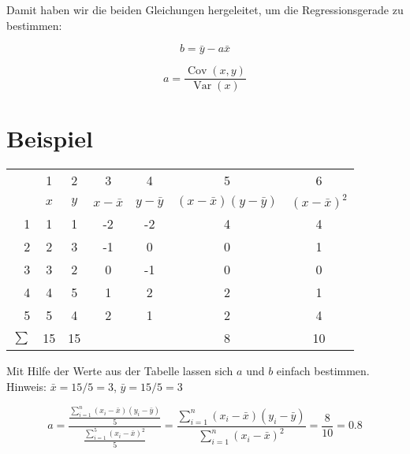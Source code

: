 \documentclass[ngerman, 12pt]{scrartcl}
\DeclareMathOperator{\cov}{Cov}
\DeclareMathOperator{\var}{Var}
\begin{document}
Damit haben wir die beiden Gleichungen hergeleitet, um die Regressionsgerade zu bestimmen:

\begin{equation}
b=\bar{y} - a \bar{x}
\end{equation}


\begin{equation}
a =  \dfrac{\cov(x,y)}{\var(x)}
\end{equation}

\section{Beispiel}

\clearpage


\begin{center}
\begin{tabular}{r|cccccc} \toprule
& 1 & 2 & 3 & 4 & 5 & 6 \\
& $x$	&	$y$	&	$x-\bar{x}$	&	$y-\bar{y}$	&	$(x-\bar{x})(y-\bar{y})$	&	$(x-\bar{x})^2$	\\ \midrule
1 & 1	&	1	&	-2	&	-2	&	4	&	4	\\
2 & 2	&	3	&	-1	&	0	&	0	&	1	\\
3 & 3	&	2	&	0	&	-1	&	0	&	0	\\
4 & 4	&	5	&	1	&	2	&	2	&	1	\\
5 & 5	&	4	&	2	&	1	&	2	&	4	\\  \midrule
$\sum$ & 15 & 15 & & & 8 & 10 \\ \bottomrule
\end{tabular}
\end{center}

%

Mit Hilfe der Werte aus der Tabelle lassen sich \(a\) und \(b\) einfach bestimmen. Hinweis: \(\bar x = 15/5 = 3\), \(\bar y = 15/5 = 3\)

\[ a = \frac{\frac{\sum_{i=1}^n \left(x_i-\bar x \right)\left(y_i-\bar y \right)}{5}}{ 
\frac{\sum_{i=1}^5 \left( x_i - \bar x \right)^2}{5}} = \frac{\sum_{i=1}^n\left(x_i-\bar x \right)\left(y_i-\bar y \right)}{\sum_{i=1}^n \left(x_i-\bar x \right)^2}  = \frac{8}{10} = 0.8 \]
\end{document}
